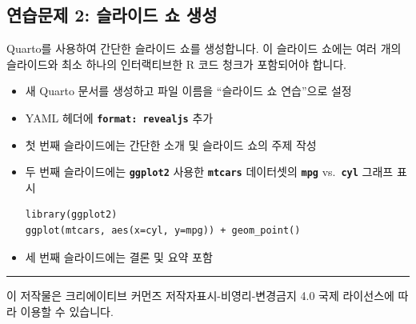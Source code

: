 \documentclass[
  a4paper,
]{book}
\begin{document}
\hypertarget{uxc5f0uxc2b5uxbb38uxc81c-2-uxc2acuxb77cuxc774uxb4dc-uxc1fc-uxc0dduxc131-1}{%
\subsection{연습문제 2: 슬라이드 쇼
생성}\label{uxc5f0uxc2b5uxbb38uxc81c-2-uxc2acuxb77cuxc774uxb4dc-uxc1fc-uxc0dduxc131-1}}

Quarto를 사용하여 간단한 슬라이드 쇼를 생성합니다. 이 슬라이드 쇼에는
여러 개의 슬라이드와 최소 하나의 인터랙티브한 R 코드 청크가 포함되어야
합니다.

\begin{itemize}
\item
  새 Quarto 문서를 생성하고 파일 이름을 ``슬라이드 쇼 연습''으로 설정
\item
  YAML 헤더에 \textbf{\texttt{format:\ revealjs}} 추가
\item
  첫 번째 슬라이드에는 간단한 소개 및 슬라이드 쇼의 주제 작성
\item
  두 번째 슬라이드에는 \textbf{\texttt{ggplot2}} 사용한
  \textbf{\texttt{mtcars}} 데이터셋의 \textbf{\texttt{mpg}}
  vs.~\textbf{\texttt{cyl}} 그래프 표시

\begin{verbatim}
library(ggplot2)
ggplot(mtcars, aes(x=cyl, y=mpg)) + geom_point()
\end{verbatim}
\item
  세 번째 슬라이드에는 결론 및 요약 포함
\end{itemize}

\begin{center}\rule{0.5\linewidth}{0.5pt}\end{center}

이 저작물은 크리에이티브 커먼즈 저작자표시-비영리-변경금지 4.0 국제
라이선스에 따라 이용할 수 있습니다.


\backmatter
\end{document}

